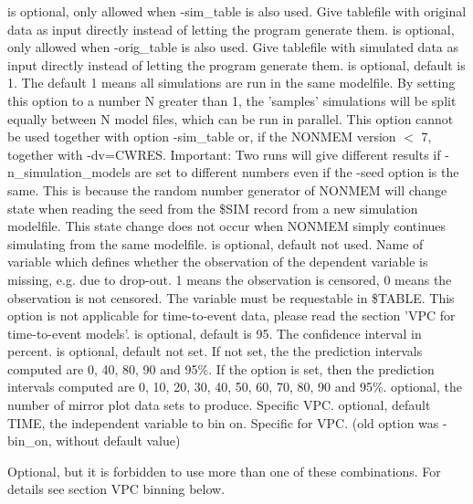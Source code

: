 \begin{optionlist}
\nextopt
{}
is optional, only allowed when -sim\_table is also used. Give tablefile with original data as input directly instead of letting the program generate them. 
\nextopt
{}
is optional, only allowed when -orig\_table is also used. Give tablefile with simulated data as input directly instead of letting the program generate them. 
\nextopt
{}
is optional, default is 1. The default 1 means all simulations are run in the same modelfile. By setting this option to a number N greater than 1, the 'samples' simulations will be split equally between N model files, which can be run in parallel. This option cannot be used together with option -sim\_table or, if the NONMEM version $<$ 7, together with -dv=CWRES. Important: Two runs will give different results if -n\_simulation\_models are set to different numbers even if the -seed option is the same. This is because the random number generator of NONMEM will change state when reading the seed from the \$SIM record from a new simulation modelfile. This state change does not occur when NONMEM simply continues simulating from the same modelfile. 
\nextopt
{}
is optional, default not used. Name of variable which defines whether the observation of the dependent variable is missing, e.g. due to drop-out. 1 means the observation is censored, 0 means the observation is not censored. The variable must be requestable in \$TABLE. This option is not applicable for time-to-event data, please read the section 'VPC for time-to-event models'. 
\nextopt
{}
is optional, default is 95. The confidence interval in percent. 
\nextopt
{}
is optional, default not set. If not set, the the prediction intervals computed are 0, 40, 80, 90 and 95\%. If the option is set, then the prediction intervals computed are 0, 10, 20, 30, 40, 50, 60, 70, 80, 90 and 95\%.  
\nextopt
{}
optional, the number of mirror plot data sets to produce. Specific VPC. 
\nextopt
{}
optional, default TIME, the independent variable to bin on. Specific for VPC. (old  option was -bin\_on, without default value) 
\nextopt
\end{optionlist}
Optional, but it is forbidden to use more than one of these combinations. For details see section VPC binning below.
